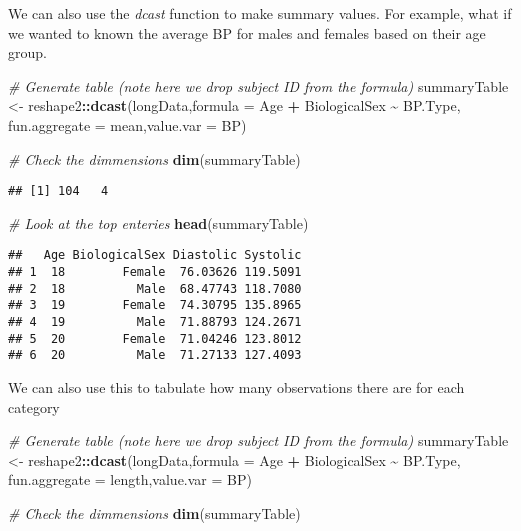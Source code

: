 \documentclass[
]{article}
\newenvironment{Shaded}{\begin{snugshade}}{\end{snugshade}}
\newcommand{\AttributeTok}[1]{\textcolor[rgb]{0.13,0.29,0.53}{#1}}
\newcommand{\CommentTok}[1]{\textcolor[rgb]{0.56,0.35,0.01}{\textit{#1}}}
\newcommand{\FunctionTok}[1]{\textcolor[rgb]{0.13,0.29,0.53}{\textbf{#1}}}
\newcommand{\NormalTok}[1]{#1}
\newcommand{\OtherTok}[1]{\textcolor[rgb]{0.56,0.35,0.01}{#1}}
\newcommand{\SpecialCharTok}[1]{\textcolor[rgb]{0.81,0.36,0.00}{\textbf{#1}}}
\newcommand{\StringTok}[1]{\textcolor[rgb]{0.31,0.60,0.02}{#1}}
\begin{document}
We can also use the \emph{dcast} function to make summary values. For
example, what if we wanted to known the average BP for males and females
based on their age group.

\begin{Shaded}
\begin{Highlighting}[]
\CommentTok{\# Generate table (note here we drop subject ID from the formula)}
\NormalTok{summaryTable }\OtherTok{\textless{}{-}}\NormalTok{ reshape2}\SpecialCharTok{::}\FunctionTok{dcast}\NormalTok{(longData,}\AttributeTok{formula =}\NormalTok{ Age }\SpecialCharTok{+}\NormalTok{ BiologicalSex }\SpecialCharTok{\textasciitilde{}}\NormalTok{ BP.Type,}
                                \AttributeTok{fun.aggregate =}\NormalTok{ mean,}\AttributeTok{value.var =} \StringTok{\textquotesingle{}BP\textquotesingle{}}\NormalTok{)}

\CommentTok{\# Check the dimmensions }
\FunctionTok{dim}\NormalTok{(summaryTable)}
\end{Highlighting}
\end{Shaded}

\begin{verbatim}
## [1] 104   4
\end{verbatim}

\begin{Shaded}
\begin{Highlighting}[]
\CommentTok{\# Look at the top enteries}
\FunctionTok{head}\NormalTok{(summaryTable)}
\end{Highlighting}
\end{Shaded}

\begin{verbatim}
##   Age BiologicalSex Diastolic Systolic
## 1  18        Female  76.03626 119.5091
## 2  18          Male  68.47743 118.7080
## 3  19        Female  74.30795 135.8965
## 4  19          Male  71.88793 124.2671
## 5  20        Female  71.04246 123.8012
## 6  20          Male  71.27133 127.4093
\end{verbatim}

We can also use this to tabulate how many observations there are for
each category

\begin{Shaded}
\begin{Highlighting}[]
\CommentTok{\# Generate table (note here we drop subject ID from the formula)}
\NormalTok{summaryTable }\OtherTok{\textless{}{-}}\NormalTok{ reshape2}\SpecialCharTok{::}\FunctionTok{dcast}\NormalTok{(longData,}\AttributeTok{formula =}\NormalTok{ Age }\SpecialCharTok{+}\NormalTok{ BiologicalSex }\SpecialCharTok{\textasciitilde{}}\NormalTok{ BP.Type,}
                                \AttributeTok{fun.aggregate =}\NormalTok{ length,}\AttributeTok{value.var =} \StringTok{\textquotesingle{}BP\textquotesingle{}}\NormalTok{)}

\CommentTok{\# Check the dimmensions }
\FunctionTok{dim}\NormalTok{(summaryTable)}
\end{Highlighting}
\end{Shaded}
\end{document}
